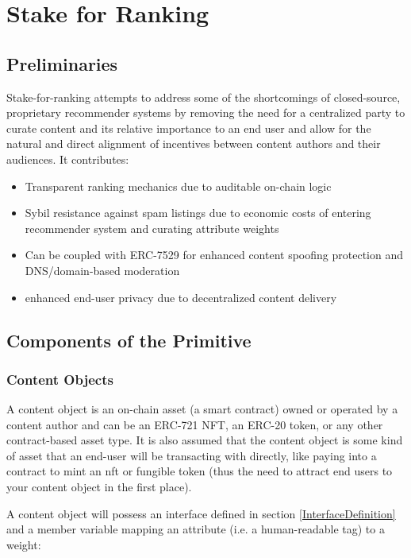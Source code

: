 \section{Stake for Ranking} 
\label{section:ProtocolDescription}

\subsection{Preliminaries}
Stake-for-ranking attempts to address some of the shortcomings of closed-source, proprietary recommender systems by removing the need for a centralized party to curate content and its relative importance to an end user and allow for the natural and direct alignment of incentives between content authors and their audiences. It contributes:
\begin{itemize}
    \item Transparent ranking mechanics due to auditable on-chain logic
    \item Sybil resistance against spam listings due to economic costs of entering recommender system and curating attribute weights
    \item Can be coupled with ERC-7529 \cite{chapman2023erc7529} for enhanced content spoofing protection and DNS/domain-based moderation
    \item enhanced end-user privacy due to decentralized content delivery
\end{itemize}

\subsection{Components of the Primitive}
\subsubsection{Content Objects}
A content object is an on-chain asset (a smart contract) owned or operated by a content author and can be an ERC-721 NFT, an ERC-20 token, or any other contract-based asset type. It is also assumed that the content object is some kind of asset that an end-user will be transacting with directly, like paying into a contract to mint an nft or fungible token (thus the need to attract end users to your content object in the first place). 

A content object will possess an interface defined in section \ref{InterfaceDefinition} and a member variable mapping an attribute (i.e. a human-readable tag) to a weight: 

